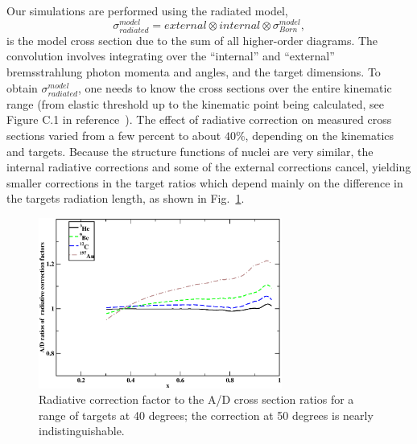 

Our simulations are performed using the radiated model,
%
\begin{equation}
\label{rc1_eqn}
\sigma^{model}_{radiated}=external\otimes internal \otimes \sigma^{model}_{Born},
\end{equation}
%
is the model cross section due to the sum of all higher-order diagrams. The
convolution involves integrating over the ``internal'' and ``external''
bremsstrahlung photon momenta and angles, and the target dimensions.
To obtain $\sigma^{model}_{radiated}$, one needs to know the cross sections
over the entire kinematic range (from elastic threshold up to the kinematic
point being calculated, see Figure C.1 in reference~\cite{dasu_thesis}). The
effect of radiative correction on measured cross sections varied from a few
percent to about $40\%$, depending on the kinematics and targets. Because the
structure functions of nuclei are very similar, the internal radiative
corrections and some of the external corrections cancel, yielding smaller
corrections in the target ratios which depend mainly on the difference in the
targets radiation length, as shown in Fig.~\ref{rc_superrat_fig}.


\begin{figure}[htbp]
\begin{center}
\includegraphics[width=80mm, angle=0]{plots/40deg_rc_suprat.eps}
\caption{Radiative correction factor to the A/D cross section ratios for a
range of targets at 40 degrees; the correction at 50 degrees is nearly
indistinguishable.
\label{rc_superrat_fig}}
\end{center}
\end{figure}

